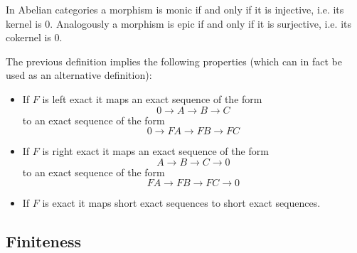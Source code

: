 	
	\begin{property}
		In Abelian categories a morphism is monic if and only if it is injective, i.e. its kernel is 0. Analogously a morphism is epic if and only if it is surjective, i.e. its cokernel is 0.
	\end{property}

	\begin{result}
		The previous definition implies the following properties (which can in fact be used as an alternative definition):
		\begin{itemize}
			\item If $F$ is left exact it maps an exact sequence of the form \[0\longrightarrow A\longrightarrow B\longrightarrow C\]
			to an exact sequence of the form \[0\longrightarrow FA\longrightarrow FB\longrightarrow FC\]
			\item If $F$ is right exact it maps an exact sequence of the form \[A\longrightarrow B\longrightarrow C\longrightarrow 0\]
			to an exact sequence of the form \[FA\longrightarrow FB\longrightarrow FC\longrightarrow 0\]
			\item If $F$ is exact it maps short exact sequences to short exact sequences.
		\end{itemize}
	\end{result}

\subsection{Finiteness}


